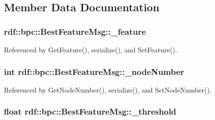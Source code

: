 \subsection{Member Data Documentation}
\subsubsection[{\texorpdfstring{\+\_\+feature}{_feature}}]{ rdf\+::bpc\+::\+Best\+Feature\+Msg\+::\+\_\+feature\hspace{0.3cm}{\ttfamily [private]}}\hypertarget{classrdf_1_1bpc_1_1BestFeatureMsg_a7b383b71e2a03d3491d1fabc810c607f}{}\label{classrdf_1_1bpc_1_1BestFeatureMsg_a7b383b71e2a03d3491d1fabc810c607f}


Referenced by Get\+Feature(), serialize(), and Set\+Feature().

\subsubsection[{\texorpdfstring{\+\_\+node\+Number}{_nodeNumber}}]{\setlength{\rightskip}{0pt plus 5cm}int rdf\+::bpc\+::\+Best\+Feature\+Msg\+::\+\_\+node\+Number\hspace{0.3cm}{\ttfamily [private]}}\hypertarget{classrdf_1_1bpc_1_1BestFeatureMsg_a50e19bc479f97975aac7194d444d283c}{}\label{classrdf_1_1bpc_1_1BestFeatureMsg_a50e19bc479f97975aac7194d444d283c}


Referenced by Get\+Node\+Number(), serialize(), and Set\+Node\+Number().

\subsubsection[{\texorpdfstring{\+\_\+threshold}{_threshold}}]{\setlength{\rightskip}{0pt plus 5cm}float rdf\+::bpc\+::\+Best\+Feature\+Msg\+::\+\_\+threshold\hspace{0.3cm}{\ttfamily [private]}}\hypertarget{classrdf_1_1bpc_1_1BestFeatureMsg_aababadc862b2794ea24eb37128b2648f}{}\label{classrdf_1_1bpc_1_1BestFeatureMsg_aababadc862b2794ea24eb37128b2648f}


